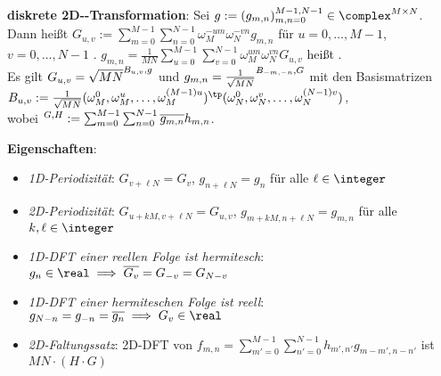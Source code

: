\linie

\textbf{diskrete 2D--Transformation}:
Sei $g := (g_{m,n})_{m,n=0}^{M-1,N-1} \in \complex^{M \times N}$.\\
Dann heißt
$G_{u,v} := \sum_{m=0}^{M-1} \sum_{n=0}^{N-1} \omega_M^{-um} \omega_N^{-vn} g_{m,n}$ für
$u = 0, \dotsc, M - 1$, $v = 0, \dotsc, N - 1$
.
$g_{m,n} = \frac{1}{MN} \sum_{u=0}^{M-1} \sum_{v=0}^{N-1} \omega_M^{um} \omega_N^{vn} G_{u,v}$
heißt .\\
Es gilt $G_{u,v} = \sqrt{MN} \sp{B_{u,v}, g}$
und $g_{m,n} = \frac{1}{\sqrt{MN}} \sp{B_{-m,-n}, G}$
mit den Basismatrizen\\
$B_{u,v} := \frac{1}{\sqrt{MN}} (\omega_M^0, \omega_M^u, \dotsc, \omega_M^{(M-1)u})^\tp
(\omega_N^0, \omega_N^v, \dotsc, \omega_N^{(N-1)v})$,\\
wobei $\sp{G, H} := \sum_{m=0}^{M-1} \sum_{n=0}^{N-1} \overline{g_{m,n}} h_{m,n}$.

\textbf{Eigenschaften}:
\begin{itemize}
    \item
    \vspace{-1mm}
    \emph{1D-Periodizität}:
    $G_{v+\ell N} = G_v$,
    $g_{n+\ell N} = g_n$
    für alle $\ell \in \integer$
    
    \item
    \vspace{-1mm}
    \emph{2D-Periodizität}:
    $G_{u+kM,v+\ell N} = G_{u,v}$,
    $g_{m+kM,n+\ell N} = g_{m,n}$
    für alle $k, \ell \in \integer$
    
    \item
    \vspace{-1mm}
    \emph{1D-DFT einer reellen Folge ist hermitesch}:
    $g_n \in \real \implies \overline{G_v} = G_{-v} = G_{N-v}$
    
    \item
    \vspace{-1mm}
    \emph{1D-DFT einer hermiteschen Folge ist reell}:
    $g_{N-n} = g_{-n} = \overline{g_n} \implies G_v \in \real$
    
    \item
    \vspace{-1mm}
    \emph{2D-Faltungssatz}:
    2D-DFT von $f_{m,n} = \sum_{m'=0}^{M-1} \sum_{n'=0}^{N-1} h_{m',n'} g_{m-m',n-n'}$
    ist $MN \cdot (H \cdot G)$
\end{itemize}

\pagebreak
